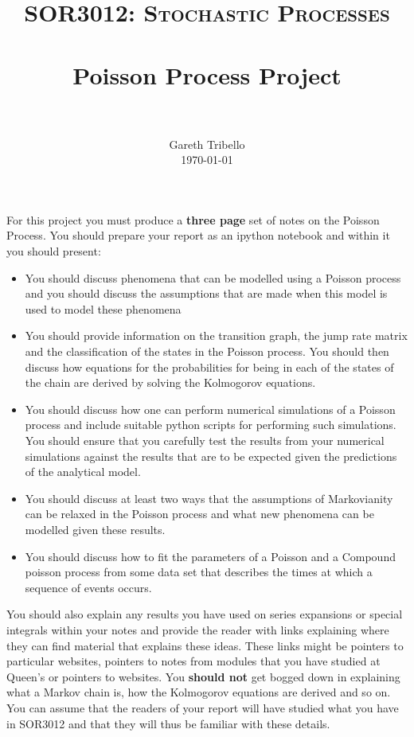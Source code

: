 \documentclass[paper=a4, fontsize=11pt]{scrartcl}
\title{\usefont{OT1}{bch}{b}{n} \normalfont \normalsize \textsc{SOR3012:
Stochastic Processes} \\ [25pt] \horrule{0.5pt} \\[0.4cm] 
\huge Poisson Process Project \\
\horrule{2pt} \\[0.25cm]
}
\author{ \normalfont
\normalsize
        Gareth Tribello \\[-3pt] \normalsize
        \today
}
\date{}
\numberwithin{equation}{section}
\numberwithin{figure}{section}
\numberwithin{table}{section}
\begin{document}
\maketitle

For this project you must produce a {\bfseries three page} set of notes on the Poisson Process.  You should prepare your report as an ipython notebook and within it you should present:

\begin{itemize}
 \item You should discuss phenomena that can be modelled using a Poisson process and you should discuss the assumptions that are made when this model is used to model these phenomena

 \item You should provide information on the transition graph, the jump rate matrix and the classification of the states in the Poisson process.  You should then discuss how equations for the probabilities for being in each of the states of the chain are derived by solving the Kolmogorov equations. 

 \item You should discuss how one can perform numerical simulations of a Poisson process and include suitable python scripts for performing such simulations.  You should ensure that you carefully test the results from your numerical simulations against the results that are to be expected given the predictions of the analytical model.

 \item You should discuss at least two ways that the assumptions of Markovianity can be relaxed in the Poisson process and what new phenomena can be modelled given these results.

 \item You should discuss how to fit the parameters of a Poisson and a Compound poisson process from some data set that describes the times at which a sequence of events occurs. 
\end{itemize}

You should also explain any results you have used on series expansions or special integrals within your notes and provide the reader with links explaining where they can find material that explains 
these ideas.  These links might be pointers to particular websites, pointers to notes from modules that you have studied at Queen's or pointers to websites.  You {\bfseries should not} get bogged down in 
explaining what a Markov chain is, how the Kolmogorov equations are derived and so on. You can assume that the readers of your report will have studied what you have in SOR3012 and that they will thus
be familiar with these details.
\end{document}
